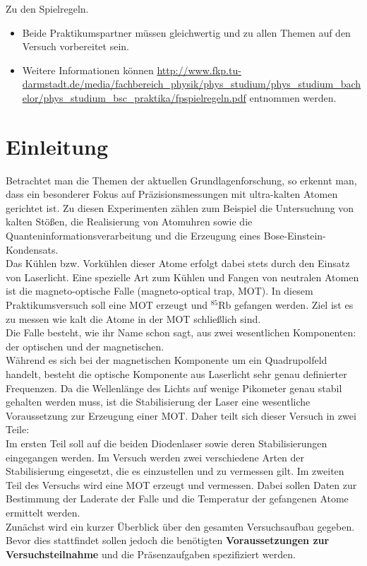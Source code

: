 \documentclass[
class=book,
accentcolor=1b,
custommargins=geometry,
fontsize=11pt,
thesis={type=Versuchsanleitung},
ruledheaders=all,
headline=false,
instbox=false,
marginpar=false,
title=small,
ignore-missing-data=true,
twoside=false,
logofile=apqdesign/tuda_logo.pdf,
pdfa=false %
]{apqpub}
\begin{document}
Zu den Spielregeln.

\begin{itemize}
	\item Beide Praktikumspartner müssen gleichwertig und zu allen Themen auf den Versuch vorbereitet sein.
	
	\item Weitere Informationen können \url{http://www.fkp.tu-darmstadt.de/media/fachbereich_physik/phys_studium/phys_studium_bachelor/phys_studium_bsc_praktika/fpspielregeln.pdf} entnommen werden.
\end{itemize}

\section{Einleitung}

Betrachtet man die Themen der aktuellen Grundlagenforschung, so erkennt man, dass ein besonderer Fokus auf
Präzisionsmessungen mit ultra-kalten Atomen gerichtet ist. Zu diesen Experimenten zählen zum Beispiel die Untersuchung von kalten Stößen, die Realisierung von Atomuhren sowie die Quanteninformationsverarbeitung und
die Erzeugung eines Bose-Einstein-Kondensats.\\
Das Kühlen bzw. Vorkühlen dieser Atome erfolgt dabei stets durch den Einsatz von Laserlicht. Eine spezielle Art
zum Kühlen und Fangen von neutralen Atomen ist die magneto-optische Falle (magneto-optical trap, MOT). In
diesem Praktikumsversuch soll eine MOT erzeugt und $^{85}$Rb gefangen werden. Ziel ist es zu messen wie kalt die
Atome in der MOT schließlich sind.\\
Die Falle besteht, wie ihr Name schon sagt, aus zwei wesentlichen Komponenten: der optischen und der magnetischen.\\
Während es sich bei der magnetischen Komponente um ein Quadrupolfeld handelt, besteht die optische Komponente
aus Laserlicht sehr genau definierter Frequenzen. Da die Wellenlänge des Lichts auf wenige Pikometer genau stabil
gehalten werden muss, ist die Stabilisierung der Laser eine wesentliche Voraussetzung zur Erzeugung einer MOT.
Daher teilt sich dieser Versuch in zwei Teile:\\
Im ersten Teil soll auf die beiden Diodenlaser sowie deren Stabilisierungen eingegangen werden. Im Versuch werden
zwei verschiedene Arten der Stabilisierung eingesetzt, die es einzustellen und zu vermessen gilt. Im zweiten
Teil des Versuchs wird eine MOT erzeugt und vermessen. Dabei sollen Daten zur Bestimmung der Laderate der
Falle und die Temperatur der gefangenen Atome ermittelt werden.\\
Zunächst wird ein kurzer Überblick über den gesamten Versuchsaufbau gegeben.\\ 
Bevor dies stattfindet sollen jedoch die benötigten \textbf{Voraussetzungen zur Versuchsteilnahme} und die Präsenzaufgaben spezifiziert werden. 
\end{document}
